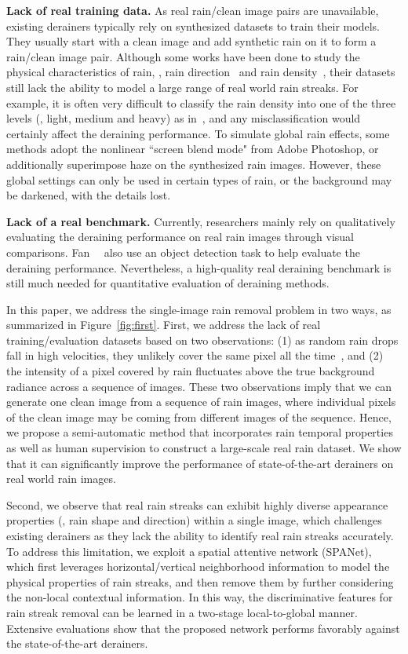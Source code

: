 \documentclass[10pt,twocolumn,letterpaper]{article}
\begin{document}
{\bf Lack of real training data.} As real rain/clean image pairs are unavailable, existing derainers typically rely on synthesized datasets to train their models. They usually start with a clean image and add synthetic rain on it to form a rain/clean image pair.
Although some works have been done to study the physical characteristics of rain, \eg, rain direction~\cite{yang:cvpr:2017:j} and rain density~\cite{zhang:cvpr:2018:did}, their datasets still lack the ability to model a large range of real world rain streaks. For example, it is often very difficult to classify the rain density into one of the three levels (\ie, light, medium and heavy) as in~\cite{zhang:cvpr:2018:did}, and any misclassification would certainly affect the deraining performance.
To simulate global rain effects, some methods adopt the nonlinear ``screen blend mode" from Adobe Photoshop, or additionally superimpose haze on the synthesized rain images. However, these global settings can only be used in certain types of rain, or the background may be darkened, with the details lost.


{\bf Lack of a real benchmark.} Currently, researchers mainly rely on qualitatively evaluating the deraining performance on real rain images through visual comparisons. Fan~\etal~\cite{fan:acmmm:2018:rgffn} also use an object detection task to help evaluate the deraining performance.
Nevertheless, a high-quality real deraining benchmark is still much needed for quantitative evaluation of deraining methods.

In this paper, we address the single-image rain removal problem in two ways, as summarized in Figure~\ref{fig:first}.
First, we address the lack of real training/evaluation datasets based on two observations:
(1) as random rain drops fall in high velocities, they unlikely cover the same pixel all the time~\cite{garg:ijcv:2007:vision,zhang:icme:2006:temporal}, and (2) the intensity of a pixel covered by rain fluctuates above the true background radiance across a sequence of images.
These two observations imply that we can generate one clean image from a sequence of rain images, where individual pixels of the clean image may be coming from different images of the sequence.
Hence, we propose a semi-automatic method that incorporates rain temporal properties as well as human supervision to construct a large-scale real rain dataset. We show that it can significantly improve the performance of state-of-the-art derainers on real world rain images. 

Second, we observe that real rain streaks can exhibit highly diverse appearance properties (\eg, rain shape and direction) within a single image, which challenges existing derainers as they lack the ability to identify real rain streaks accurately.
To address this limitation, we exploit a spatial attentive network (SPANet), which first leverages horizontal/vertical neighborhood information to model the physical properties of rain streaks, and then remove them by further considering the non-local contextual information.
In this way, the discriminative features for rain streak removal can be learned in a two-stage local-to-global manner.
Extensive evaluations show that the proposed network performs favorably against the state-of-the-art derainers.
\end{document}
